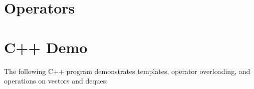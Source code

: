 \documentclass[12pt,letterpaper,oneside]{article}
\begin{document}
\section*{Operators}

\newpage

\section*{C++ Demo}
The following C++ program demonstrates templates, operator overloading, and operations on vectors and deques:
\inputminted{cpp}{demos.cpp}
\end{document}
